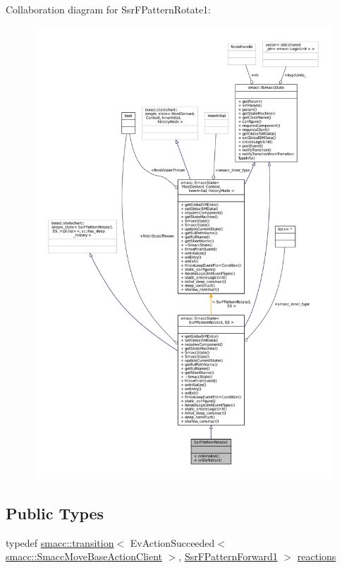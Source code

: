 Collaboration diagram for Ssr\+F\+Pattern\+Rotate1\+:
\nopagebreak
\begin{figure}[H]
\begin{center}
\leavevmode
\includegraphics[width=350pt]{structSsrFPatternRotate1__coll__graph}
\end{center}
\end{figure}
\subsection*{Public Types}
\begin{DoxyCompactItemize}
\item 
typedef \hyperlink{classsmacc_1_1transition}{smacc\+::transition}$<$ Ev\+Action\+Succeeded$<$ \hyperlink{classsmacc_1_1SmaccMoveBaseActionClient}{smacc\+::\+Smacc\+Move\+Base\+Action\+Client} $>$, \hyperlink{structSsrFPatternForward1}{Ssr\+F\+Pattern\+Forward1} $>$ \hyperlink{structSsrFPatternRotate1_af65def78e3ba069f32f55ef99ed0e658}{reactions}
\end{DoxyCompactItemize}
